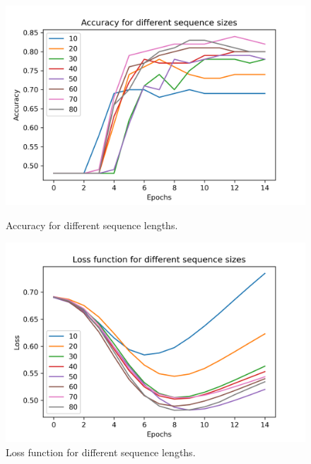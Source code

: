 \documentclass{article}
\begin{document}
\begin{figure}[h!]
  \centering
  \begin{minipage}[b]{0.45\textwidth}
    \includegraphics[width=\textwidth]{images/seq_length_test_acc.png}
    \caption{Accuracy for different sequence lengths.}
  \end{minipage}
  \hfill
  \begin{minipage}[b]{0.45\textwidth}
    \includegraphics[width=\textwidth]{images/seq_length_test_loss.png}
    \caption{Loss function for different sequence lengths.}
  \end{minipage}
  \label{fig:seq}
\end{figure}
\end{document}
